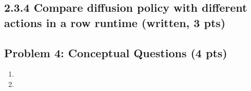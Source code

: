 \documentclass[12pt]{article}
\begin{document}
\subsection*{2.3.4 Compare diffusion policy with different actions in a row runtime (written, 3 pts)}
\begin{tcolorbox}[fit,height=10em, width=40em, blank, borderline={1pt}{1pt},nobeforeafter]
            \begin{center}
            \begin{solution}

            \end{solution}
            \end{center}
            \end{tcolorbox}

\clearpage




 
\subsection*{Problem 4: Conceptual Questions (4 pts)}

\begin{tcolorbox}[fit,height=22em, width=40em, blank, borderline={1pt}{1pt},nobeforeafter]
\begin{center}
\begin{solution}
\begin{enumerate}
    \item 
    \item 
\end{enumerate}
\end{solution}
\end{center}
\end{tcolorbox}
\end{document}
